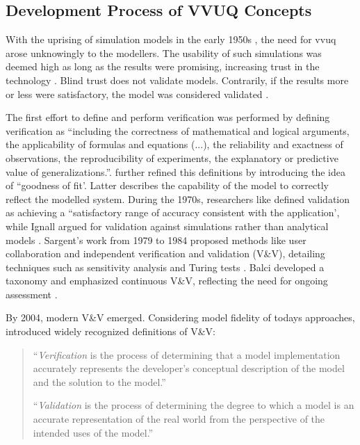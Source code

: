 \subsection{Development Process of VVUQ Concepts}
\label{sec:historical-development}
With the uprising of simulation models in the early 1950s \autocite{evans1967simulation}, the need for \gls{vvuq} arose unknowingly to the modellers. The usability of such simulations was deemed high as long as the results were promising, increasing trust in the technology \autocite{durst2017historical}. Blind trust does not validate models. Contrarily, if the results more or less were satisfactory, the model was considered validated \autocite{bonani2003physics}.

The first effort to define and perform verification was performed by \textcite{machlup1955problem} defining verification as ``including the correctness of mathematical and logical arguments, the applicability of formulas and equations (...), the reliability and exactness of observations, the reproducibility of experiments, the explanatory or predictive value of generalizations.''. \Textcite{naylor1967verification} further refined this definitions by introducing the idea of ``goodness of fit'. Latter describes the capability of the model to correctly reflect the modelled system. During the 1970s, researchers like \textcite{schlesinger1979terminology} defined validation as achieving a ``satisfactory range of accuracy consistent with the application', while Ignall argued for validation against simulations rather than analytical models \autocite{ignall1978using}. Sargent's work from 1979 to 1984 proposed methods like user collaboration and independent verification and validation (V\&V), detailing techniques such as sensitivity analysis and Turing tests \autocite{Sargent2010wsc}. Balci developed a taxonomy and emphasized continuous V\&V, reflecting the need for ongoing assessment \autocite{balci2012life}.

By 2004, modern V\&V emerged. Considering model fidelity of todays approaches, \textcite{Oberkampf2004amr} introduced widely recognized definitions of V\&V:

\begin{quote}
    ``\textit{Verification} is the process of determining that a model implementation accurately represents the developer's conceptual description of the model and the solution to the model.''

    ``\textit{Validation} is the process of determining the degree to which a model is an accurate representation of the real world from the perspective of the intended uses of the model.'' \autocite{Oberkampf2004amr}
\end{quote}

